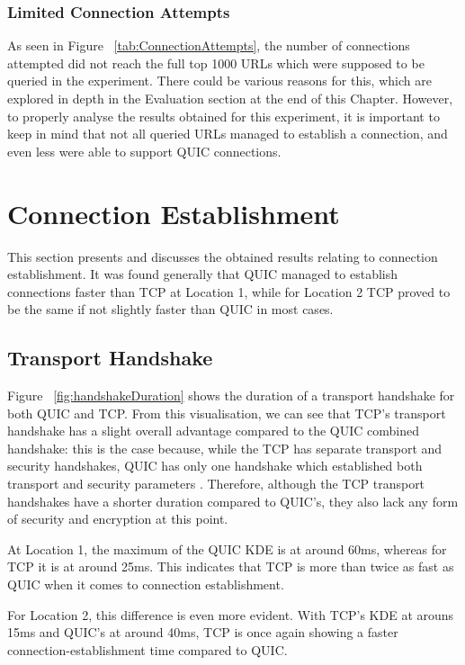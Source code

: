 \documentclass{l4proj}
\begin{document}
\subsubsection{Limited Connection Attempts} As seen in Figure ~\ref{tab:ConnectionAttempts}, the number of connections attempted did not reach the full top 1000 URLs which were supposed to be queried in the experiment. There could be various reasons for this, which are explored in depth in the Evaluation section at the end of this Chapter. However, to properly analyse the results obtained for this experiment, it is important to keep in mind that not all queried URLs managed to establish a connection, and even less were able to support QUIC connections.

\section{Connection Establishment}

This section presents and discusses the obtained results relating to connection establishment. It was found generally that QUIC managed to establish connections faster than TCP at Location 1, while for Location 2 TCP proved to be the same if not slightly faster than QUIC in most cases. 

\subsection{Transport Handshake}

Figure ~\ref{fig:handshakeDuration} shows the duration of a transport handshake for both QUIC and TCP. From this visualisation, we can see that TCP's transport handshake has a slight overall advantage compared to the QUIC combined handshake: this is the case because, while the TCP has separate transport and security handshakes, QUIC has only one handshake which established both transport and security parameters \citep{Lang2017}. Therefore, although the TCP transport handshakes have a shorter duration compared to QUIC's, they also lack any form of security and encryption at this point. 

At Location 1, the maximum of the QUIC KDE is at around 60ms, whereas for TCP  it is at around 25ms. This indicates that TCP is more than twice as fast as QUIC when it comes to  connection establishment. 

For Location 2, this difference is even more evident. With TCP's KDE at arouns 15ms and QUIC's at around 40ms, TCP is once again showing a faster connection-establishment time compared to QUIC. 
\end{document}
